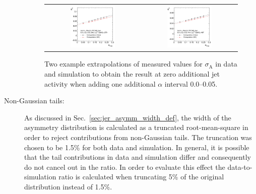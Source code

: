 \begin{description}
\begin{figure}[!tp]
  \centering
  \begin{tabular}{cc}
                \includegraphics[width=0.49\textwidth]{figures/Extrapol_Eta0_pt4_final_nominal_NoMinPtCutForThirdJet_AddNewAlphaBin_v4.pdf} &
                \includegraphics[width=0.49\textwidth]{figures/Extrapol_Eta0_pt9_final_nominal_NoMinPtCutForThirdJet_AddNewAlphaBin_v4.pdf}
  \end{tabular}
  \caption{Two example extrapolations of measured values for $\sigma_\mathrm{A}$ in data and simulation to obtain the result at zero additional jet activity when adding one additional $\alpha$ interval 0.0--0.05.}
  \label{fig:syst_uncert_alpha_range}
\end{figure}

\item[Non-Gaussian tails:] As discussed in Sec.~\ref{sec:jer_asymm_width_def}, the width of the asymmetry distribution is calculated as a truncated root-mean-square in order to reject contributions from non-Gaussian tails. The truncation was chosen to be 1.5\% for both data and simulation. In general, it is possible that the tail contributions in data and simulation differ and consequently do not cancel out in the ratio. In order to evaluate this effect the data-to-simulation ratio is calculated when truncating 5\% of the original distribution instead of 1.5\%.  


\end{description}
